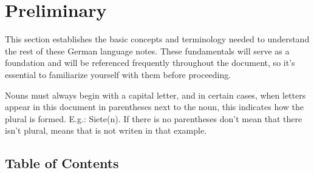 \section{Preliminary}\label{sec:preliminary}

This section establishes the basic concepts and terminology needed to understand the rest of these German language notes. These fundamentals will serve as a foundation and will be referenced frequently throughout the document, so it's essential to familiarize yourself with them before proceeding.

Nouns must always begin with a capital letter, and in certain cases, when letters appear in this document in parentheses next to the noun, this indicates how the plural is formed. E.g.: Siete(n). If there is no parentheses don't mean that there isn't plural, means that is not writen in that example. 

\subsection{Table of Contents}

\startcontents[sections]
\printcontents[sections]{}{}{} 